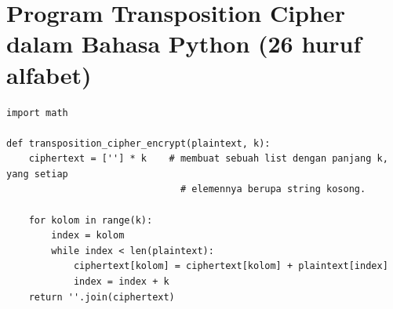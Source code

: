 \documentclass{article}
\begin{document}

\section*{Program Transposition Cipher dalam Bahasa Python (26 huruf alfabet)}

\begin{verbatim}
import math

def transposition_cipher_encrypt(plaintext, k):
    ciphertext = [''] * k    # membuat sebuah list dengan panjang k, yang setiap
                               # elemennya berupa string kosong.

    for kolom in range(k):
        index = kolom
        while index < len(plaintext):
            ciphertext[kolom] = ciphertext[kolom] + plaintext[index]
            index = index + k
    return ''.join(ciphertext)
\end{verbatim}
\end{document}
